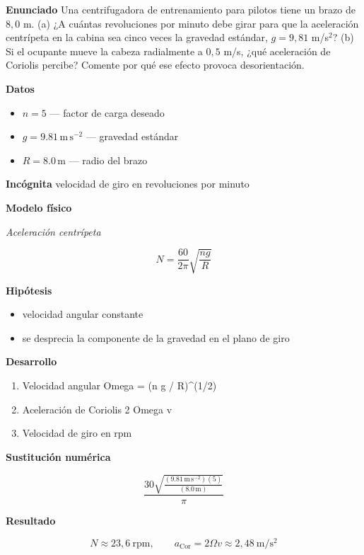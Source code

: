 \documentclass[10pt,openany]{book}
\begin{document}
\begin{tcolorbox}[title={Problema resuelto}, studiumworked, breakable]

\noindent\textbf{Enunciado}
Una centrifugadora de entrenamiento para pilotos tiene un brazo de \(8{,}0\) m. (a) ¿A cuántas revoluciones por minuto debe girar para que la aceleración centrípeta en la cabina sea cinco veces la gravedad estándar, \(g = 9{,}81\) m/s\(^2\)? (b) Si el ocupante mueve la cabeza radialmente a \(0{,}5\) m/s, ¿qué aceleración de Coriolis percibe? Comente por qué ese efecto provoca desorientación.

\noindent\textbf{Datos}
\begin{itemize}
\item $n = 5$ — factor de carga deseado
\item $g = 9.81\,\mathrm{m}\,\mathrm{s}^{-2}$ — gravedad estándar
\item $R = 8.0\,\mathrm{m}$ — radio del brazo
\end{itemize}

\noindent\textbf{Incógnita}
velocidad de giro en revoluciones por minuto

\noindent\textbf{Modelo físico}

\noindent\textit{Aceleración centrípeta}

\[
N = \frac{60}{2\pi}\sqrt{\frac{n g}{R}}
\]

\noindent\textbf{Hipótesis}
\begin{itemize}
\item velocidad angular constante
\item se desprecia la componente de la gravedad en el plano de giro
\end{itemize}

\noindent\textbf{Desarrollo}
\begin{enumerate}
\item
Velocidad angular Omega = (n g / R)\textasciicircum{}(1/2)
\item
Aceleración de Coriolis 2 Omega v
\item
Velocidad de giro en rpm
\end{enumerate}

\noindent\textbf{Sustitución numérica}

\[
\frac{30 \sqrt{\frac{\left(9.81\,\mathrm{m}\,\mathrm{s}^{-2}\right) \left(5\right)}{\left(8.0\,\mathrm{m}\right)}}}{\pi}
\]

\noindent\textbf{Resultado}

\[
N \approx 23{,}6\ \mathrm{rpm},\qquad a_{\mathrm{Cor}} = 2\Omega v \approx 2{,}48\ \mathrm{m/s^{2}}
\]


\end{tcolorbox}
\end{document}
